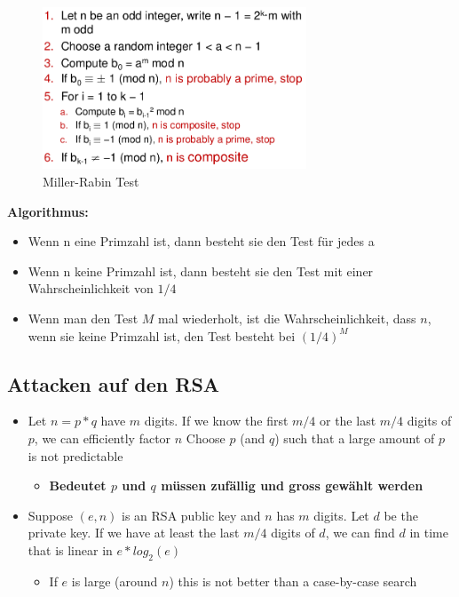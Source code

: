 \begin{figure}[H]
\centering
\includegraphics[width=0.7\textwidth]{figures/Miller-Rabin-Algorithmus.png}
\caption{Miller-Rabin Test}
\end{figure}

\textbf{Algorithmus:}

\begin{itemize}
\tightlist
\item
  Wenn n eine Primzahl ist, dann besteht sie den Test für jedes a
\item
  Wenn n keine Primzahl ist, dann besteht sie den Test mit einer
  Wahrscheinlichkeit von $1/4$
\item
  Wenn man den Test $M$ mal wiederholt, ist die Wahrscheinlichkeit, dass
  $n$, wenn sie keine Primzahl ist, den Test besteht bei $(1/4)^M$
\end{itemize}

\clearpage
\hypertarget{attacken-auf-den-rsa}{%
\subsection{Attacken auf den RSA}\label{attacken-auf-den-rsa}}

\begin{itemize}
\tightlist
\item
  Let $n = p*q$ have $m$ digits. If we know the first $m/4$ or the last $m/4$
  digits of $p$, we can efficiently factor $n$ Choose $p$ (and $q$) such that a
  large amount of $p$ is not predictable
  \begin{itemize}
  \tightlist
  \item
    \textbf{Bedeutet $p$ und $q$ müssen zufällig und gross gewählt werden}
  \end{itemize}
\item
  Suppose $(e,n)$ is an RSA public key and $n$ has $m$ digits. Let $d$ be the
  private key. If we have at least the last $m/4$ digits of $d$, we can find
  $d$ in time that is linear in $e*log_2(e)$

  \begin{itemize}
  \tightlist
  \item
    If $e$ is large (around $n$) this is not better than a case-by-case search
  \end{itemize}
\end{itemize}

